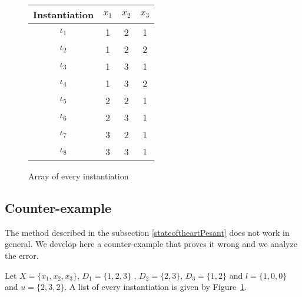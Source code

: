 \documentclass[jair,twoside,11pt,theapa]{article}
\begin{document}

\begin{figure}
	\centering
	\begin{tabular}{|c|ccc|}
			\hline
			Instantiation & $x_1$ & $x_2$ & $x_3$ \\
			\hline
			$\iota_1$ & 1 & 2 & 1 \\
			$\iota_2$ &1 & 2 & 2 \\
			$\iota_3$ &1 & 3 & 1 \\
			$\iota_4$ &1 & 3 & 2 \\
			$\iota_5$ &2 & 2 & 1 \\
			$\iota_6$ &2 & 3 & 1 \\
			$\iota_7$ &3 & 2 & 1 \\
			$\iota_8$ &3 & 3 & 1 \\
			\hline
		\end{tabular}
	\caption{Array of every instantiation}
	\label{ListOfInstantiations}
	\end{figure}
    
\subsection{Counter-example}
\label{counter-example}
The method described in the subsection \ref{stateoftheartPesant} does not work in general. We develop here a counter-example that proves it wrong and we analyze the error.

Let $X=\lbrace x_1, x_2, x_3 \rbrace$, $ D_1=\lbrace 1,2,3 \rbrace$ , $D_2= \lbrace 2,3\rbrace$, $D_3= \lbrace 1,2\rbrace$ and $l=\lbrace 1,0,0 \rbrace$ and $u=\lbrace 2,3,2 \rbrace$. A list of every instantiation is given by Figure~\ref{ListOfInstantiations}.
	
\end{document}

